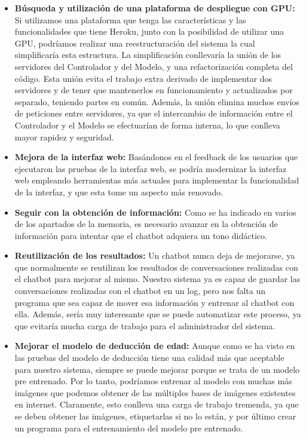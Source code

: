 \begin{itemize}
\item \textbf{Búsqueda y utilización de una plataforma de despliegue con GPU:} Si utilizamos una plataforma que tenga las características y las funcionalidades que tiene Heroku, junto con la posibilidad de utilizar una GPU, podríamos realizar una reestructuración del sistema la cual simplificaría esta estructura. La simplificación conllevaría la unión de los servidores del Controlador y del Modelo, y una refactorización completa del código. Esta unión evita el trabajo extra derivado de implementar dos servidores y de tener que mantenerlos en funcionamiento y actualizados por separado, teniendo partes en común. Además, la unión elimina muchos envíos de peticiones entre servidores, ya que el intercambio de información entre el Controlador y el Modelo se efectuarían de forma interna, lo que conlleva mayor rapidez y seguridad.
\item \textbf{Mejora de la interfaz web:} Basándonos en el feedback de los usuarios que ejecutaron las pruebas de la interfaz web, se podría modernizar la interfaz web empleando herramientas más actuales para implementar la funcionalidad de la interfaz, y que esta tome un aspecto más renovado.
\item \textbf{Seguir con la obtención de información:} Como se ha indicado en varios de los apartados de la memoria, es necesario avanzar en la obtención de información para intentar que el chatbot adquiera un tono didáctico.
\item \textbf{Reutilización de los resultados:} Un chatbot nunca deja de mejorarse, ya que normalmente se reutilizan los resultados de conversaciones realizadas con el chatbot para mejorar al mismo. Nuestro sistema ya es capaz de guardar las conversaciones realizadas con el chatbot en un log, pero nos falta un programa que sea capaz de mover esa información y entrenar al chatbot con ella. Además, sería muy interesante que se puede automatizar este proceso, ya que evitaría mucha carga de trabajo para el administrador del sistema.
\item \textbf{Mejorar el modelo de deducción de edad:} Aunque como se ha visto en las pruebas del modelo de deducción tiene una calidad más que aceptable para nuestro sistema, siempre se puede mejorar porque se trata de un modelo pre entrenado. Por lo tanto, podríamos entrenar al modelo con muchas más imágenes que podemos obtener de las múltiples bases de imágenes existentes en internet. Claramente, esto conlleva una carga de trabajo tremenda, ya que se deben obtener las imágenes, etiquetarlas si no lo están, y por último crear un programa para el entrenamiento del modelo pre entrenado.

\end{itemize}
